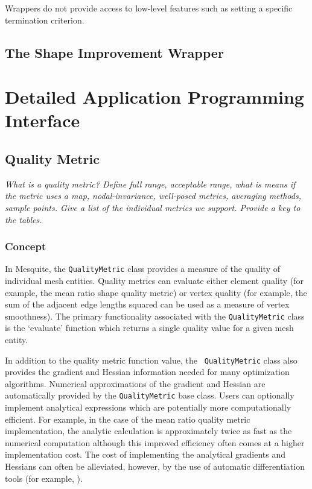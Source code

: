 \documentclass[letter]{report}
\begin{document}
Wrappers do not provide access to low-level 
features such as setting a specific
termination criterion.  

\subsection{The Shape Improvement Wrapper}


\section{Detailed Application Programming Interface}

\subsection{Quality Metric}

{\it 
What is a quality metric? Define full range, acceptable range, what is means 
if the metric uses a map, nodal-invariance, well-posed metrics, averaging 
methods, sample points. Give a list of the individual metrics we support. 
Provide a key to the tables.
}

\subsubsection{Concept}

In Mesquite, the \texttt{QualityMetric} class provides a measure of
the quality of individual mesh entities.  Quality metrics can evaluate
either element quality (for example, the mean ratio shape quality
metric) or vertex quality (for example, the sum of the adjacent edge
lengths squared can be used as a measure of vertex smoothness).  
The primary functionality associated with the {\tt QualityMetric}
class is the `evaluate' function which returns a single quality value
for a given mesh entity.

In addition to the quality metric function value, the {\tt
QualityMetric} class also provides the gradient and Hessian
information needed for many optimization algorithms.  Numerical
approximations of the gradient and Hessian are automatically provided
by the \texttt{QualityMetric} base class.  Users can optionally
implement analytical expressions which are potentially more
computationally efficient.  For example, in the case of the mean ratio
quality metric implementation, the analytic calculation is
approximately twice as fast as the numerical computation although this
improved efficiency often comes at a higher implementation cost.  The
cost of implementing the analytical gradients and Hessians can often
be alleviated, however, by the use of automatic differentiation tools
(for example, \cite{bischofadic}).
\end{document}
